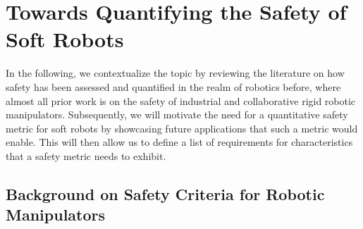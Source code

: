 \section{Towards Quantifying the Safety of Soft Robots}
In the following, we contextualize the topic by reviewing the literature on how safety has been assessed and quantified in the realm of robotics before, where almost all prior work is on the safety of industrial and collaborative rigid robotic manipulators.
Subsequently, we will motivate the need for a quantitative safety metric for soft robots by showcasing future applications that such a metric would enable.
This will then allow us to define a list of requirements for characteristics that a safety metric needs to exhibit.

\subsection{Background on Safety Criteria for Robotic Manipulators}

